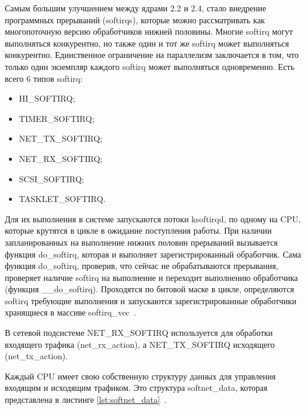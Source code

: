 Самым большим улучшением между ядрами 2.2 и 2.4, стало внедрение программных прерываний (softirqs), которые можно рассматривать как многопоточную версию обработчиков нижней половины. Многие softirq могут выполняться конкурентно, но также один и тот же softirq может выполняться конкурентно. Единственное ограничение на параллелизм заключается в том, что только один экземпляр каждого softirq может выполняться одновременно. Есть всего 6 типов softirq:
\begin{itemize}[label=---]
	\item HI\_SOFTIRQ;
	\item TIMER\_SOFTIRQ;
	\item NET\_TX\_SOFTIRQ;
	\item NET\_RX\_SOFTIRQ;
	\item SCSI\_SOFTIRQ;
	\item TASKLET\_SOFTIRQ.
\end{itemize}

Для их выполнения в системе запускаются потоки ksoftirqd, по одному на CPU, которые крутятся в цикле в ожидание поступления работы. При наличии запланированных на выполнение нижних половин прерываний вызывается функция do\_softirq, которая и выполняет зарегистрированный обработчик. Сама функция do\_softirq, проверив, что сейчас не обрабатываются прерывания, проверяет наличие softirq на выполнение и переходит выполнению обработчика (функция \_\_do\_softirq). Проходятся по битовой маске в цикле, определяются softirq требующие выполнения и запускаются зарегистрированные обработчики хранящиеся в массиве softirq\_vec~\cite{guide}. 

В сетевой подсистеме NET\_RX\_SOFTIRQ используется для обработки входящего трафика (net\_rx\_action), а NET\_TX\_SOFTIRQ исходящего (net\_tx\_action).

Каждый CPU имеет свою собственную структуру данных для управления входящим и исходящим трафиком. Это структура  softnet\_data, которая представлена в листинге \ref{lst:softnet_data}~\cite{softnet_data}.

